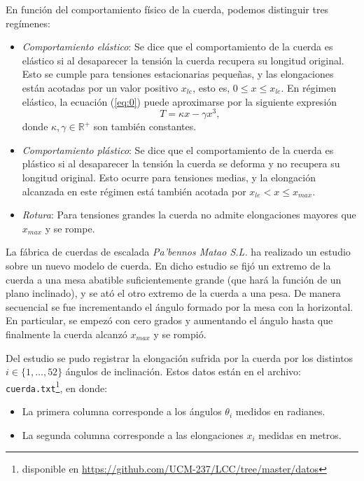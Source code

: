 En función del comportamiento físico de la cuerda, podemos distinguir tres regímenes:

\begin{itemize}
	\item \emph{Comportamiento elástico}: Se dice que el comportamiento de la cuerda es elástico si al desaparecer la tensión la cuerda recupera su longitud original. Esto se cumple para tensiones estacionarias pequeñas, y las elongaciones están acotadas por un valor positivo $x_{le}$, esto es, $0 \le x \le x_{le}$. En régimen elástico, la ecuación (\ref{eq:0}) puede aproximarse por la siguiente expresión
\begin{equation}\label{eq:1}
T = \kappa x - \gamma x^3,
\end{equation}
donde $\kappa,\gamma \in \mathbb{R}^+$ son también constantes.

\item \emph{Comportamiento plástico}: Se dice que el comportamiento de la cuerda es plástico si al desaparecer la tensión la cuerda se deforma y no recupera su longitud original. Esto ocurre para tensiones medias, y la elongación alcanzada en este régimen está también acotada por $x_{le} < x \le x_{max}$.

\item \emph{Rotura}: Para tensiones grandes la cuerda no admite elongaciones mayores que $x_{max}$ y se rompe.

\end{itemize}

La fábrica de cuerdas de escalada \textit{Pa'bennos Matao S.L.} ha realizado un estudio sobre un nuevo modelo de cuerda. En dicho estudio se fijó un extremo de la cuerda a una mesa abatible suficientemente grande (que hará la función de un plano inclinado), y se ató el otro extremo de la cuerda a una pesa. De manera secuencial se fue incrementando el ángulo formado por la mesa con la horizontal. En particular, se empezó con cero grados y aumentando el ángulo hasta que finalmente la cuerda alcanzó $x_{max}$ y se rompió. 

Del estudio se pudo registrar la elongación sufrida por la cuerda por los distintos $i\in\{1,\dots,52\}$ ángulos de inclinación. Estos datos están en el archivo:  \texttt{cuerda.txt}\footnote{disponible en \url{https://github.com/UCM-237/LCC/tree/master/datos}}, en donde:
\begin{itemize}
	\item La primera columna corresponde a los ángulos $\theta_i$ medidos en radianes.
	\item La segunda columna corresponde a las elongaciones $x_i$ medidas en metros.
\end{itemize}

